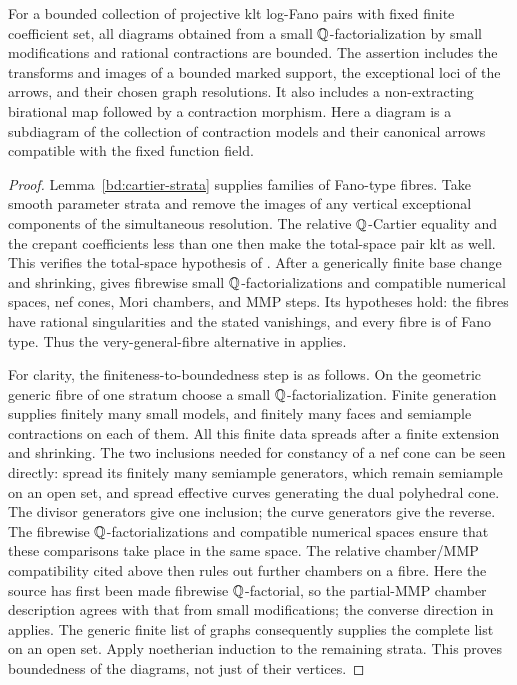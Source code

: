 \begin{lemma}
\label{bd:contractions}
For a bounded collection of projective klt log-Fano pairs with fixed
finite coefficient set, all diagrams obtained from a small
$\mathbb Q$-factorialization by small modifications and rational contractions
are bounded.  The assertion includes the transforms and images of a
bounded marked support, the exceptional loci of the arrows, and their
chosen graph resolutions.  It also includes a non-extracting birational map
followed by a contraction morphism.
Here a diagram is a subdiagram of the collection of contraction models
and their canonical arrows compatible with the fixed function field.
\end{lemma}

\begin{proof}
Lemma~\ref{bd:cartier-strata} supplies families of Fano-type fibres.
Take smooth parameter strata and remove the images of any vertical
exceptional components of the simultaneous resolution.  The relative
$\mathbb Q$-Cartier equality and the crepant coefficients less than one
then make the total-space pair klt as well.  This verifies the
total-space hypothesis of \cite[Theorem~1.4]{CLZ26}.
After a generically finite base change and shrinking,
\cite[Theorems~1.4--1.6]{CLZ26} gives fibrewise small
$\mathbb Q$-factorializations and compatible numerical spaces, nef cones,
Mori chambers, and MMP steps.  Its hypotheses hold: the fibres have
rational singularities and the stated vanishings, and every fibre
is of Fano type.  Thus the very-general-fibre alternative in
\cite[Theorem~1.2]{CLZ26} applies.

For clarity, the finiteness-to-boundedness step is as follows.  On
the geometric generic fibre of one stratum choose a small
$\mathbb Q$-factorialization.  Finite generation supplies finitely many
small models, and finitely many faces and semiample contractions
on each of them.  All this finite data spreads after a finite
extension and shrinking.  The two inclusions needed for constancy
of a nef cone can be seen directly: spread its finitely many
semiample generators, which remain semiample on an open set, and
spread effective curves generating the dual polyhedral cone.
The divisor generators give one inclusion; the curve generators
give the reverse.  The fibrewise $\mathbb Q$-factorializations and
compatible numerical spaces ensure that these comparisons take
place in the same space.  The relative chamber/MMP compatibility
cited above then rules out further chambers on a fibre.
Here the source has first been made fibrewise $\mathbb Q$-factorial, so the
partial-MMP chamber description agrees with that from small modifications;
the converse direction in \cite[Theorem~1.6(3)]{CLZ26} applies.  The
generic finite list of graphs consequently supplies the complete
list on an open set.  Apply noetherian induction to the remaining
strata.  This proves boundedness of the diagrams, not just of their
vertices.


\end{proof}
